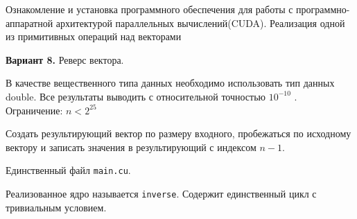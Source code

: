 \documentclass[12pt]{article}
\begin{document}


Ознакомление и установка программного обеспечения для
работы с программно-аппаратной архитектурой параллельных вычислений(CUDA).
Реализация одной из примитивных операций над векторами

\textbf{Вариант 8.} Реверс вектора.

В качестве вещественного типа данных необходимо использовать тип данных
double. Все результаты выводить с относительной точностью $10^{-10}$ . Ограничение:
$n < 2^{25}$

\nvidia

Создать результирующий вектор по размеру входного, пробежаться по исходному вектору
и записать значения в результирующий с индексом $n-1$.

Единственный файл \lstinline|main.cu|.

Реализованное ядро называется \lstinline|inverse|. Содержит единственный цикл с тривиальным условием.


\newpage

\end{document}
